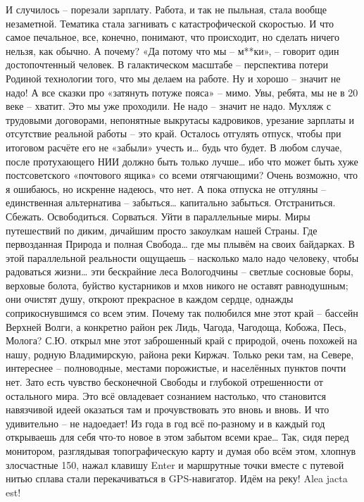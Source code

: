 И случилось – порезали зарплату. Работа, и так не пыльная, стала вообще незаметной. Тематика стала загнивать с катастрофической скоростью. И что самое печальное, все, конечно, понимают, что происходит, но сделать ничего нельзя, как обычно. А почему? «Да потому что мы – м**ки», – говорит один достопочтенный человек. В галактическом масштабе – перспектива потери Родиной технологии того, что мы делаем на работе. Ну и хорошо – значит не надо! А все сказки про «затянуть потуже пояса» – мимо. Увы, ребята, мы не в 20 веке – хватит. Это мы уже проходили. Не надо – значит не надо. Мухляж с трудовыми договорами, непонятные выкрутасы кадровиков, урезание зарплаты и отсутствие реальной работы – это край. Осталось отгулять отпуск, чтобы при итоговом расчёте его не «забыли» учесть и… будь что будет. В любом случае, после протухающего НИИ должно быть только лучше… ибо что может быть хуже постсоветского «почтового ящика» со всеми отягчающими? Очень возможно, что я ошибаюсь, но искренне надеюсь, что нет.
А пока отпуска не отгуляны – единственная альтернатива – забыться… капитально забыться. Отстраниться. Сбежать. Освободиться. Сорваться. Уйти в параллельные миры. Миры путешествий по диким, дичайшим просто закоулкам нашей Страны. Где первозданная Природа и полная Свобода… где мы плывём на своих байдарках. В этой параллельной реальности ощущаешь – насколько мало надо человеку, чтобы радоваться жизни… эти бескрайние леса Вологодчины – светлые сосновые боры, верховые болота, буйство кустарников и мхов никого не оставят равнодушным; они очистят душу, откроют прекрасное в каждом сердце, однажды соприкоснувшимся со всем этим. 
Почему так полюбился мне этот край – бассейн Верхней Волги, а конкретно район рек Лидь, Чагода, Чагодоща, Кобожа, Песь, Молога? С.Ю. открыл мне этот заброшенный край с природой, очень похожей на нашу, родную Владимирскую, района реки Киржач. Только реки там, на Севере, интереснее – полноводные, местами порожистые, и населённых пунктов почти нет. Зато есть чувство бесконечной Свободы и глубокой отрешенности от остального мира. Это всё овладевает сознанием настолько, что становится навязчивой идеей оказаться там и прочувствовать это вновь и вновь. И что удивительно – не надоедает! Из года в год всё по-разному и в каждый год открываешь для себя что-то новое в этом забытом всеми крае… 
Так, сидя перед монитором, разглядывая топографическую карту и думая обо всём этом, хлопнув злосчастные 150, нажал клавишу Enter и маршрутные точки вместе с путевой нитью сплава стали перекачиваться в GPS-навигатор. Идём на реку! Alea jacta est!

\begin{center}
\end{center}
